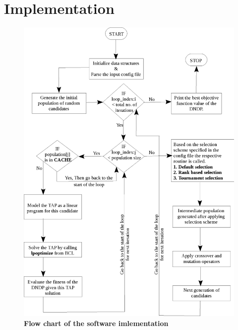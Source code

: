 \documentclass[a4paper, 12pt]{article}
\begin{document}
\section{Implementation}
\begin{figure}[htbp]
\hspace*{-0.3in}
\includegraphics[scale=0.95]{./diagram.eps}%
\caption{\textbf{Flow chart of the software imlementation}}
\label{fig 1}
\end{figure}
\end{document}
